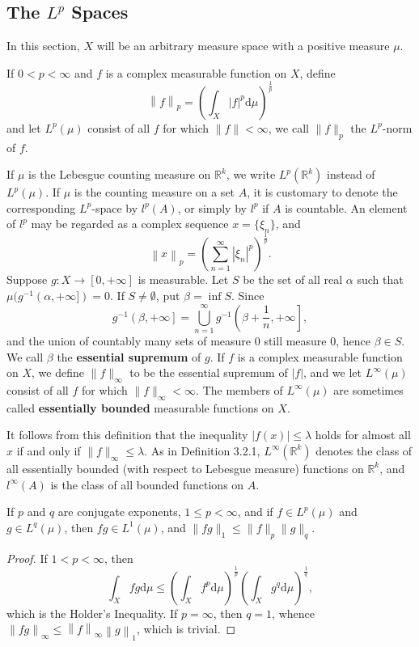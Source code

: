 \subsection{The $L^p$ Spaces}
In this section, $X$ will be an arbitrary measure space with a positive measure $\mu$.
\begin{definition}
If $0<p<\infty$ and $f$ is a complex measurable function on $X$, define 
$$
\left\| f \right\| _p=\left( \int_X{\left| f \right|^p\mathrm{d}\mu} \right) ^{\frac{1}{p}}
$$
and let $L^p(\mu)$ consist of all $f$ for which $\|f\|<\infty$, we call $\|f\|_p$ the $L^p$-norm of $f$.
\end{definition}
If $\mu$ is the Lebesgue counting measure on $\mathbb{R}^k$, we write $L^p(\mathbb{R}^k)$ instead of $L^p(\mu)$. If $\mu$ is the counting measure on a set $A$, it is customary to denote the corresponding $L^p$-space by $l^p(A)$, or simply by $l^p$ if $A$ is countable. An element of $l^p$ may be regarded as a complex sequence $x=\{\xi_n\}$, and 
$$
\left\| x \right\| _p=\left( \sum_{n=1}^{\infty}{\left| \xi _n \right|^p} \right) ^{\frac{1}{p}}.
$$
Suppose $g:X\to[0,+\infty]$ is measurable. Let $S$ be the set of all real $\alpha$ such that $\mu(g^{-1}(\alpha,+\infty])=0$. If $S\ne\emptyset$, put $\beta=\inf S$. Since 
$$
g^{-1}\left( \beta ,+\infty \right] =\bigcup_{n=1}^{\infty}{g^{-1}\left( \beta +\frac{1}{n},+\infty \right]},
$$
and the union of countably many sets of measure $0$ still measure $0$, hence $\beta\in S$. We call $\beta$ the \textbf{essential supremum} of $g$. If $f$ is a complex measurable function on $X$, we define $\|f\|_\infty$ to be the essential supremum of $|f|$, and we let $L^\infty(\mu)$ consist of all $f$ for which $\|f\|_\infty<\infty$. The members of $L^\infty(\mu)$ are sometimes called \textbf{essentially bounded} measurable functions on $X$.\par
It follows from this definition that the inequality $|f(x)|\le\lambda$ holds for almost all $x$ if and only if $\|f\|_\infty\le\lambda$. As in Definition 3.2.1, $L^\infty(\mathbb{R}^k)$ denotes the class of all essentially bounded (with respect to Lebesgue measure) functions on $\mathbb{R}^k$, and $l^\infty(A)$ is the class of all bounded functions on $A$.
\begin{theorem}
If $p$ and $q$ are conjugate exponents, $1\le p<\infty$, and if $f\in L^p(\mu)$ and $g\in L^q(\mu)$, then $fg\in L^1(\mu)$, and $\|fg\|_1\le\|f\|_p\|g\|_q$.
\end{theorem}
\begin{proof}
If $1<p<\infty$, then 
$$
\int_X{fg\mathrm{d}\mu}\le \left( \int_X{f^p\mathrm{d}\mu} \right) ^{\frac{1}{p}}\left( \int_X{g^q\mathrm{d}\mu} \right) ^{\frac{1}{q}},
$$
which is the Holder's Inequality. If $p=\infty$, then $q=1$, whence $\left\| fg \right\| _{\infty}\le \left\| f \right\| _{\infty}\left\| g \right\| _1$, which is trivial.
\end{proof}
